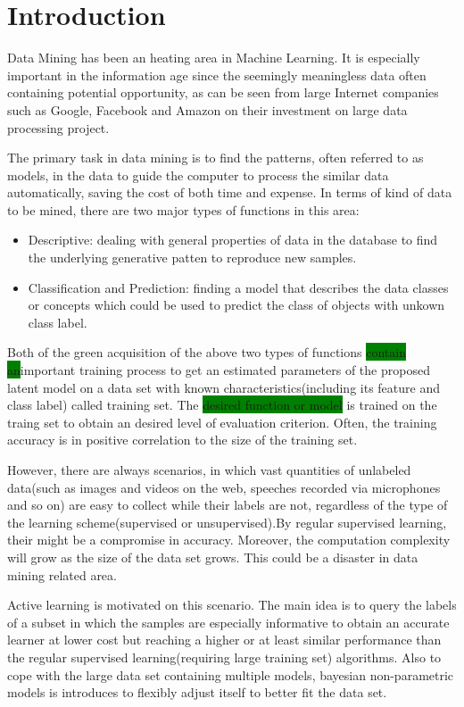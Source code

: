 \section{Introduction}
\indent Data Mining has been an heating area in Machine Learning. It is especially important in the information age since the seemingly meaningless data often containing potential opportunity, as can be seen from large Internet companies such as Google, Facebook and Amazon \cite{mcafee2012big}on their investment on large data processing project. 

The primary task in data mining is to find the patterns, often referred to as models, in the data to guide the computer to process the similar data automatically, saving the cost of both time and expense. In terms of kind of data to be mined, there are two major types of functions in this area\cite{bishop2006pattern}:
\begin{itemize}
\item Descriptive: dealing with general properties of data in the database to find the underlying generative patten to reproduce new samples.
\item Classification and Prediction: finding a model that describes the data classes or concepts which could be used to predict the class of objects with unkown class label.  
\end{itemize}
Both of the green acquisition of the above two types of functions \colorbox{green}{contain an}important training process to get an estimated parameters of the proposed latent model on a data set with known characteristics(including its feature and class label) called training set. The \colorbox{green}{desired function or model} is trained on the traing set to obtain an desired level of evaluation criterion. Often, the training accuracy is  in positive correlation to the size of the training set\colorbox{green}{\cite{dietterich2000ensemble}}. 


However, there are always scenarios, in which vast quantities of unlabeled data(such as images and videos on the web, speeches recorded via microphones and so on) are easy to collect while their labels are not, regardless of the type of the learning scheme(supervised or unsupervised)\cite{Settles2010,druck2009active}.By regular supervised learning, their might be a compromise in accuracy. Moreover, the computation complexity will grow as the size of the data set grows. This could be a disaster in data mining related area. 

Active learning is motivated on this scenario\colorbox{green}{\cite{Settles2010}}. The main idea is to query the labels of a subset in which the samples are especially informative to obtain an accurate learner at lower cost but reaching a higher or at least similar performance than the regular supervised learning(requiring large training set) algorithms. Also to cope with the large data set containing multiple models, bayesian non-parametric models is introduces to flexibly adjust itself to better fit the data set\cite{walker1999bayesian,ghosh1982nonparametric}. 

